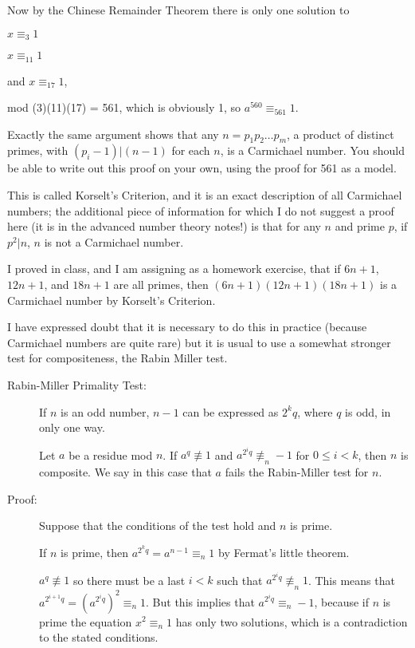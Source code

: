 \documentclass[12pt]{article}
\begin{document}
Now by the Chinese Remainder Theorem there is only one solution to 

$x \equiv_3 1$

$x \equiv_{11} 1$

and $x \equiv_{17} 1$,

mod (3)(11)(17) = 561, which is obviously 1, so $a^{560} \equiv_{561} 1$.

Exactly the same argument shows that any $n = p_1p_2\ldots p_m$, a product of distinct primes, with
$(p_i-1)|(n-1)$ for each $n$, is a Carmichael number.  You should be able to write out this proof on your own,
using the proof for 561 as a model.

This is called Korselt's Criterion, and it is an exact description of all Carmichael numbers;  the additional piece of information for which I do not suggest a proof here (it is in the advanced number theory notes!) is that for any $n$ and prime $p$, if $p^2 |n$, $n$ is not a Carmichael number.

I proved in class, and I am assigning as a homework exercise, that if $6n+1$, $12n+1$, and $18n+1$ are all primes, then
$(6n+1)(12n+1)(18n+1)$ is a Carmichael number by Korselt's Criterion.

I have expressed doubt that it is necessary to do this in practice (because Carmichael numbers are quite rare) but it is usual to use a somewhat stronger test for compositeness, the Rabin Miller test.

\begin{description}

\item[Rabin-Miller Primality Test:]  If $n$ is an odd number, $n-1$ can be expressed as $2^kq$, where $q$ is odd, in only one way.

Let $a$ be a residue mod $n$.  If $a^q \not\equiv 1$ and $a^{2^iq} \not\equiv_n -1$ for $0 \leq i <k$, then $n$ is composite.  We say in this case that $a$ fails the Rabin-Miller test for $n$.

\item[Proof:]  Suppose that the conditions of the test hold and $n$ is prime.

If $n$ is prime, then $a^{2^kq} = a^{n-1} \equiv_n 1$ by Fermat's little theorem.

$a^q \not\equiv 1$ so there must be a last $i<k$ such that $a^{2^iq} \not\equiv_n 1$.  This means that
$a^{2^{i+1}q} = (a^{2^iq})^2 \equiv_n 1$.  But this implies that $a^{2^iq}\equiv_n -1$, because if $n$ is prime
the equation $x^2 \equiv_n 1$ has only two solutions, which is a contradiction to the stated conditions.

\end{description}
\end{document}
